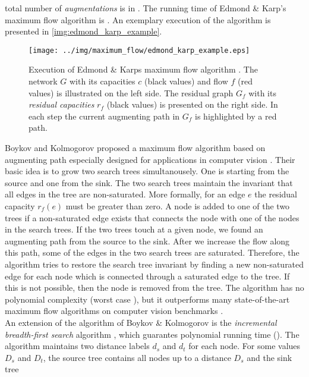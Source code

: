 total number of \emph{augmentations} is in . The running time of Edmond \& Karp's
maximum flow algorithm is . An exemplary execution of the algorithm
is presented in \autoref{img:edmond_karp_example}. \\
\begin{figure}
\centering
\texttt{[image: ../img/maximum\_flow/edmond\_karp\_example.eps]}
\caption{Execution of Edmond \& Karps maximum flow algorithm \cite{edmonds1972theoretical}.
         The network $G$ with its capacities $c$ (black values) and flow $f$ (red values) is illustrated
         on the left side. The residual graph $G_f$ with its \emph{residual capacities} $r_f$ (black values)
         is presented on the right side. In each step the current augmenting path in $G_f$ is highlighted
         by a red path. }
\label{img:edmond_karp_example}
\end{figure}
Boykov and Kolmogorov proposed a maximum flow algorithm based on augmenting path especially
designed for applications in computer vision \cite{boykov2004experimental}. Their basic idea is to 
grow two search trees simultanousely. One is starting from the source and one from the sink.
The two search trees maintain the invariant that all edges in the tree are non-saturated. More formally,
for an edge $e$ the residual capacity $r_f(e)$ must be greater than zero.
A node is added to one of the two trees if a non-saturated edge exists that connects
the node with one of the nodes in the search trees. If the two trees touch at a given node, we found
an augmenting path from the source to the sink. After we increase the flow along this
path, some of the edges in the two search trees are saturated. Therefore, the algorithm
tries to restore the search tree invariant by finding a new non-saturated edge for each node which
is connected through a saturated edge to the tree. If this is not possible, then the node is removed
from the tree. The algorithm has no polynomial complexity (worst case ), but it
outperforms many state-of-the-art maximum flow algorithms on computer vision benchmarks \cite{boykov2004experimental}.\\
An extension of the algorithm of Boykov \& Kolmogorov is the \emph{incremental breadth-first search}
algorithm \cite{goldberg2011maximum}, which guarantes polynomial running time ().
The algorithm maintains two distance labels $d_s$ and $d_t$ for each node. For some values 
$D_s$ and $D_t$, the source tree contains all nodes up to a distance $D_s$ and the sink tree
